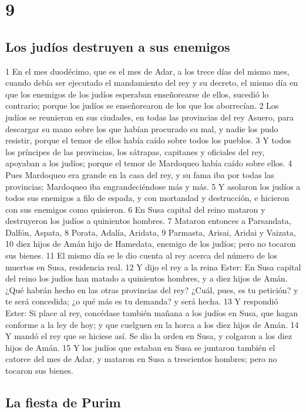 \chapter{9}

\section*{Los judíos destruyen a sus enemigos}

1 En el mes duodécimo, que es el mes de Adar, a los trece días del mismo mes, cuando debía ser ejecutado el mandamiento del rey y su decreto, el mismo día en que los enemigos de los judíos esperaban enseñorearse de ellos, sucedió lo contrario; porque los judíos se enseñorearon de los que los aborrecían.
2 Los judíos se reunieron en sus ciudades, en todas las provincias del rey Asuero, para descargar su mano sobre los que habían procurado su mal, y nadie los pudo resistir, porque el temor de ellos había caído sobre todos los pueblos.
3 Y todos los príncipes de las provincias, los sátrapas, capitanes y oficiales del rey, apoyaban a los judíos; porque el temor de Mardoqueo había caído sobre ellos.
4 Pues Mardoqueo era grande en la casa del rey, y su fama iba por todas las provincias; Mardoqueo iba engrandeciéndose más y más.
5 Y asolaron los judíos a todos sus enemigos a filo de espada, y con mortandad y destrucción, e hicieron con sus enemigos como quisieron.
6 En Susa capital del reino mataron y destruyeron los judíos a quinientos hombres.
7 Mataron entonces a Parsandata, Dalfón, Aspata,
8 Porata, Adalía, Aridata,
9 Parmasta, Arisai, Aridai y Vaizata,
10 diez hijos de Amán hijo de Hamedata, enemigo de los judíos; pero no tocaron sus bienes.
11 El mismo día se le dio cuenta al rey acerca del número de los muertos en Susa, residencia real.
12 Y dijo el rey a la reina Ester: En Susa capital del reino los judíos han matado a quinientos hombres, y a diez hijos de Amán. ¿Qué habrán hecho en las otras provincias del rey? ¿Cuál, pues, es tu petición? y te será concedida; ¿o qué más es tu demanda? y será hecha.
13 Y respondió Ester: Si place al rey, concédase también mañana a los judíos en Susa, que hagan conforme a la ley de hoy; y que cuelguen en la horca a los diez hijos de Amán.
14 Y mandó el rey que se hiciese así. Se dio la orden en Susa, y colgaron a los diez hijos de Amán.
15 Y los judíos que estaban en Susa se juntaron también el catorce del mes de Adar, y mataron en Susa a trescientos hombres; pero no tocaron sus bienes.

\section*{La fiesta de Purim}

